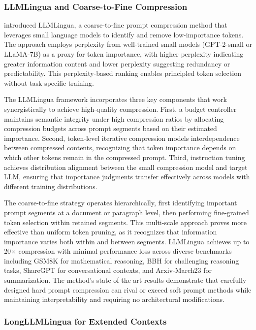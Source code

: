 \documentclass[11pt,letterpaper]{article}
\begin{document}
\subsubsection{LLMLingua and Coarse-to-Fine Compression}

\cite{jiang2023llmlingua} introduced LLMLingua, a coarse-to-fine prompt compression method that leverages small language models to identify and remove low-importance tokens. The approach employs perplexity from well-trained small models (GPT-2-small or LLaMA-7B) as a proxy for token importance, with higher perplexity indicating greater information content and lower perplexity suggesting redundancy or predictability. This perplexity-based ranking enables principled token selection without task-specific training.

The LLMLingua framework incorporates three key components that work synergistically to achieve high-quality compression. First, a budget controller maintains semantic integrity under high compression ratios by allocating compression budgets across prompt segments based on their estimated importance. Second, token-level iterative compression models interdependence between compressed contents, recognizing that token importance depends on which other tokens remain in the compressed prompt. Third, instruction tuning achieves distribution alignment between the small compression model and target LLM, ensuring that importance judgments transfer effectively across models with different training distributions.

The coarse-to-fine strategy operates hierarchically, first identifying important prompt segments at a document or paragraph level, then performing fine-grained token selection within retained segments. This multi-scale approach proves more effective than uniform token pruning, as it recognizes that information importance varies both within and between segments. LLMLingua achieves up to 20$\times$ compression with minimal performance loss across diverse benchmarks including GSM8K for mathematical reasoning, BBH for challenging reasoning tasks, ShareGPT for conversational contexts, and Arxiv-March23 for summarization. The method's state-of-the-art results demonstrate that carefully designed hard prompt compression can rival or exceed soft prompt methods while maintaining interpretability and requiring no architectural modifications.

\subsubsection{LongLLMLingua for Extended Contexts}
\end{document}
